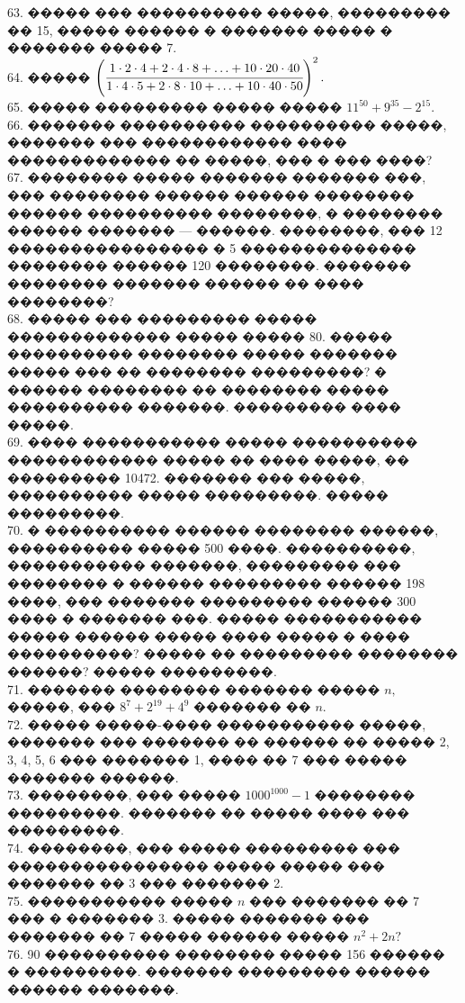 \documentclass[12pt]{article}
\begin{document}
63. ����� ��� ���������� �����, ��������� �� 15, ����� ������ � ������� ����� � ������� ����� 7.\\
64. ����� $\left( \cfrac{1\cdot2\cdot4+2\cdot4\cdot8+\ldots+10\cdot20\cdot40}{1\cdot4\cdot5+2\cdot8\cdot10+\ldots+10\cdot40\cdot50}\right)^2.$\\
65. ����� ��������� ����� ����� $11^{50}+9^{35}-2^{15}.$\\
66. ������� ���������� ���������� �����, ������� ��� ������������ ���� ������������� �� �����, ��� � ��� ����?\\
67. �������� ����� ������� ������� ���, ��� �������� ������ ������ �������� ������ ���������� ��������, � �������� ������ ������� --- ������. ��������, ��� 12 ���������������� � 5 �������������� �������� ������ 120 ��������. ������� �������� ������� ������ �� ���� ��������?\\
68. ����� ��� ��������� ����� ������������� ����� ����� 80. ����� ���������� �������� ����� ������� ����� ��� �� �������� ���������? � ������ �������� �� �������� ����� ���������� �������. ��������� ���� �����.\\
69. ���� ����������� ����� ���������� ������������ ����� �� ���� �����, �� ��������� 10472. ������� ��� �����, ���������� ����� ���������. ����� ���������.\\
70. � ���������� ������ �������� ������, ���������� ����� 500 ����. ����������, ����������� �������, ��������� ��� �������� � ������ ��������� ������ 198 ����, ��� ������� ��������� ������ 300 ���� � ������� ���. ����� ����������� ����� ������ ����� ���� ����� � ���� ����������? ����� �� ��������� �������� ������? ����� ���������.\\
71. ������� �������� ������� ����� $n,$ �����, ��� $8^7+2^{19}+4^9$ ������� �� $n.$\\
72. ����� �����-���� ����������� �����, ������� ��� ������� �� ������ �� ����� 2, 3, 4, 5, 6 ��� ������� 1, ���� �� 7 ��� ����� ������� ������.\\
73. ��������, ��� ����� $1000^{1000}-1$ �������� ���������. ������� �� ����� ���� ��� ���������.\\
74. ��������, ��� ����� ��������� ��� ���������������� ����� ����� ��� ������� �� 3 ��� ������� 2.\\
75. ����������� ����� $n$ ��� ������� �� 7 ��� � ������� 3. ����� ������� ��� ������� �� 7 ����� ������ ����� $n^2+2n?$\\
76. 90 ���������� �������� ����� 156 ������ � ���������. ������� ��������� ������ ������ �������.\\
\end{document}
